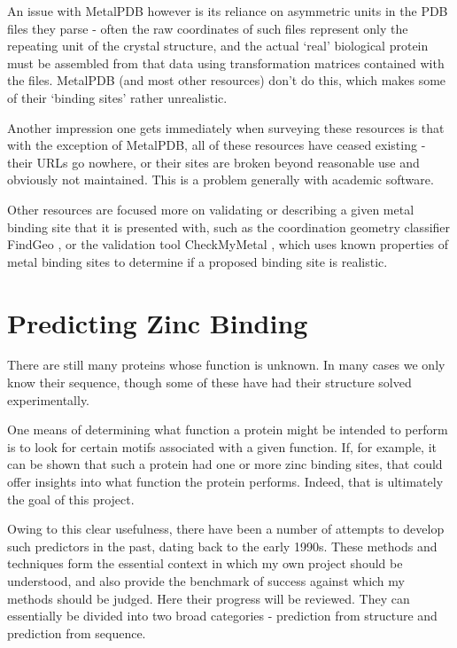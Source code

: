 An issue with MetalPDB however is its reliance on asymmetric units in the PDB files they parse - often the raw coordinates of such files represent only the repeating unit of the crystal structure, and the actual `real' biological protein must be assembled from that data using transformation matrices contained with the files. MetalPDB (and most other resources) don't do this, which makes some of their `binding sites' rather unrealistic.

Another impression one gets immediately when surveying these resources is that with the exception of MetalPDB, all of these resources have ceased existing - their URLs go nowhere, or their sites are broken beyond reasonable use and obviously not maintained. This is a problem generally with academic software.

Other resources are focused more on validating or describing a given metal binding site that it is presented with, such as the coordination geometry classifier FindGeo \cite{andreini2012findgeo}, or the validation tool CheckMyMetal \cite{zheng2017checkmymetal}, which uses known properties of metal binding sites to determine if a proposed binding site is realistic.


\section{Predicting Zinc Binding}

There are still many proteins whose function is unknown. In many cases we only know their sequence, though some of these have had their structure solved experimentally.

One means of determining what function a protein might be intended to perform is to look for certain motifs associated with a given function. If, for example, it can be shown that such a protein had one or more zinc binding sites, that could offer insights into what function the protein performs. Indeed, that is ultimately the goal of this project.

Owing to this clear usefulness, there have been a number of attempts to develop such predictors in the past, dating back to the early 1990s. These methods and techniques form the essential context in which my own project should be understood, and also provide the benchmark of success against which my methods should be judged. Here their progress will be reviewed. They can essentially be divided into two broad categories - prediction from structure and prediction from sequence.

